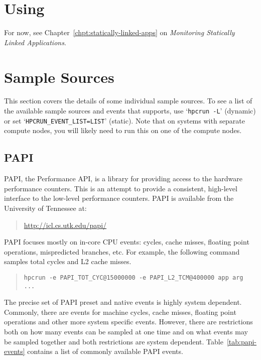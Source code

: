 
\section{Using \hpclink{}}

For now, see Chapter~\ref{chpt:statically-linked-apps} on {\it
Monitoring Statically Linked Applications}.


\section{Sample Sources}

This section covers the details of some individual sample sources.  To
see a list of the available sample sources and events that \hpcrun{}
supports, use `\verb|hpcrun -L|' (dynamic) or set
`\verb|HPCRUN_EVENT_LIST=LIST|' (static).  Note that on systems with
separate compute nodes, you will likely need to run this on one of the
compute nodes.

\subsection{PAPI}

PAPI, the Performance API, is a library for providing access to the
hardware performance counters.  This is an attempt to provide a
consistent, high-level interface to the low-level performance
counters.  PAPI is available from the University of Tennessee at:

\begin{quote}
\url{http://icl.cs.utk.edu/papi/}
\end{quote}

PAPI focuses mostly on in-core CPU events: cycles, cache misses,
floating point operations, mispredicted branches, etc.  For example,
the following command samples total cycles and L2 cache misses.

\begin{quote}
\begin{verbatim}
hpcrun -e PAPI_TOT_CYC@15000000 -e PAPI_L2_TCM@400000 app arg ...
\end{verbatim}
\end{quote}

The precise set of PAPI preset and native events is highly system
dependent.  Commonly, there are events for machine cycles, cache
misses, floating point operations and other more system specific
events.  However, there are restrictions both on how many events can
be sampled at one time and on what events may be sampled together and
both restrictions are system dependent.  Table~\ref{tab:papi-events}
contains a list of commonly available PAPI events.

